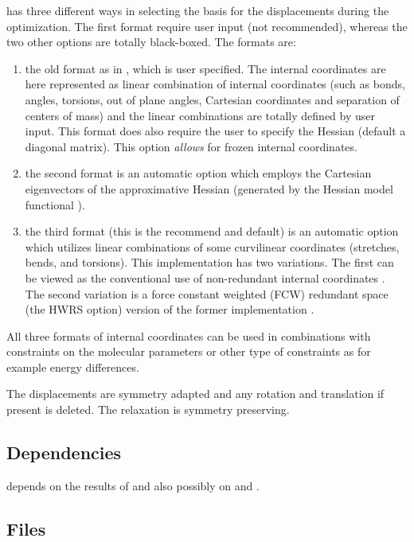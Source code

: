  has three different ways in selecting the
basis for the displacements during the optimization.
The first format require user input (not recommended), whereas the two other options are totally black-boxed.
The formats are:
\begin{enumerate}
\item
the old format as in \molcasiii, which is user specified.
The internal coordinates
are here represented as linear combination of internal coordinates
(such as bonds, angles, torsions, out of plane angles, Cartesian coordinates
and separation of centers of mass) and the linear combinations are totally defined
by user input.
This format does also require the user to specify the
Hessian (default a diagonal matrix).
This option {\it allows} for frozen internal coordinates.
\item
the second format is an automatic
option which employs the Cartesian eigenvectors of the approximative Hessian (generated by the
Hessian model functional \cite{HMF}).
\item
the third format (this is the recommend and default) is an automatic option which utilizes linear combinations
of some curvilinear coordinates (stretches, bends, and torsions).
This implementation
has two variations. The first can be viewed as the conventional use of
non-redundant internal coordinates \cite{nric1,nric2,nric3}.
The second variation is a force constant weighted (FCW)
redundant space (the HWRS option) version of the former
implementation \cite{Lindh:97}.
\end{enumerate}
All three formats of internal coordinates can be used in combinations with
constraints on the molecular parameters or other type of constraints as for
example energy differences.

The displacements are symmetry adapted
and any rotation and translation if present is deleted.
The relaxation is symmetry preserving.

\subsection{Dependencies}
\label{UG:sec:SlapAf_dependencies}
 depends on the results of  and also possibly
on  and .

\subsection{Files}
\label{UG:sec:SlapAf_files}

